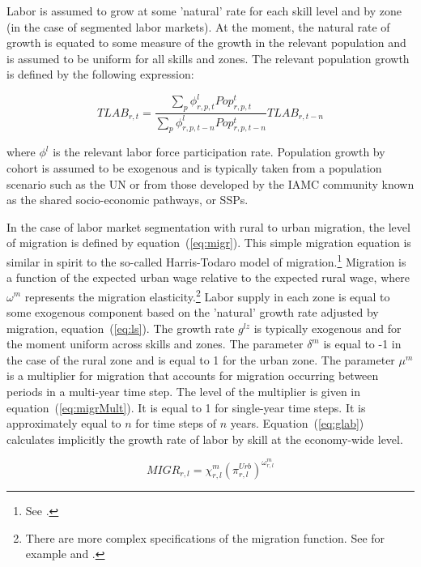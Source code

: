 \documentclass[11pt,letterpaper]{report}
\begin{document}
Labor is assumed to grow at some 'natural' rate for each skill level and by zone
(in the case of segmented labor markets). At the moment, the natural rate of
growth is equated to some measure of the growth in the relevant population and
is assumed to be uniform for all skills and zones. The relevant population
growth is defined by the following expression:

\[
\mathit{TLAB_{r,t}} =
   \frac {\displaystyle \sum_{p}{\phi^l_{r,p,t} \mathit{Pop^t_{r,p,t}} } }
   {\displaystyle \sum_{p}{\phi^l_{r,p,t-n} \mathit{Pop^t_{r,p,t-n}} } }
   \mathit{TLAB_{r,t-n}}
\]

\noindent where $\phi^l$ is the relevant labor force participation rate.
Population growth by cohort is assumed to be exogenous and is typically taken
from a population scenario such as the UN or from those developed by the IAMC
community known as the shared socio-economic pathways, or SSPs.

In the case of labor market segmentation with rural to urban migration, the
level of migration is defined by equation~(\ref{eq:migr}). This simple migration
equation is similar in spirit to the so-called Harris-Todaro model of
migration.\footnote{See \cite{HarrisTodaro1970}.} Migration is a function of the
expected urban wage relative to the expected rural wage, where $\omega^m$
represents the migration elasticity.\footnote{There are more complex
specifications of the migration function. See for example \cite{Burniaux1987}
and \cite{BDvdM1991}.} Labor supply in each zone is equal to some exogenous
component based on the 'natural' growth rate adjusted by migration,
equation~(\ref{eq:ls}). The growth rate $g^{\mathit{lz}}$ is typically exogenous
and for the moment uniform across skills and zones. The parameter $\delta^m$ is
equal to -1 in the case of the rural zone and is equal to 1 for the urban zone.
The parameter $\mu^m$ is a multiplier for migration that accounts for migration
occurring between periods in a multi-year time step. The level of the multiplier
is given in equation~(\ref{eq:migrMult}). It is equal to 1 for single-year time
steps. It is approximately equal to $n$ for time steps of $n$ years.
Equation~(\ref{eq:glab}) calculates implicitly the growth rate of labor by skill
at the economy-wide level.

\begin{equation}
\label{eq:migr}
\mathit{MIGR}_{r,l} =
   \chi^m_{r,l} \left( \pi^{\mathit{Urb}}_{r,l} \right)^{\omega^m_{r,l}}
\end{equation}
\end{document}
